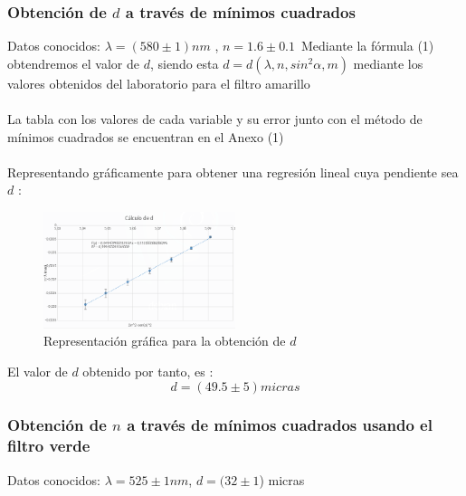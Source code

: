 \documentclass[11pt,letterpaper,twocolumn]{article}
\begin{document}
\subsubsection{Obtención de $d$ a través de mínimos cuadrados}
Datos conocidos: $\lambda=( 580 \pm 1) nm$ , $n=1.6\pm 0.1$\
Mediante la fórmula (1) obtendremos el valor de $d$, siendo esta 
$d=d(\lambda,n,sin^2 \alpha,m)$ mediante los valores obtenidos del laboratorio para el filtro amarillo\\
\\
La tabla con los valores de cada variable y su error junto con el método de mínimos cuadrados se encuentran en el Anexo (1)\\
\\
Representando gráficamente para obtener una regresión lineal cuya pendiente sea $d$ :
\begin{figure}[H]
	\centering
	\includegraphics[width=0.50\textwidth]{imagen/graficad.png}
	\caption{Representación gráfica para la obtención de $d$}
	\label{fig:imagen-}
\end{figure}
El valor de $d$ obtenido por tanto, es :
\begin{equation}
	\boxed{d=(49.5 \pm 5) micras}
\end{equation}
\subsubsection{Obtención de $n$ a través de mínimos cuadrados usando el filtro verde}
Datos conocidos: $\lambda=525\pm 1 nm$, $d=(32 \pm 1$) micras \\
\end{document}
